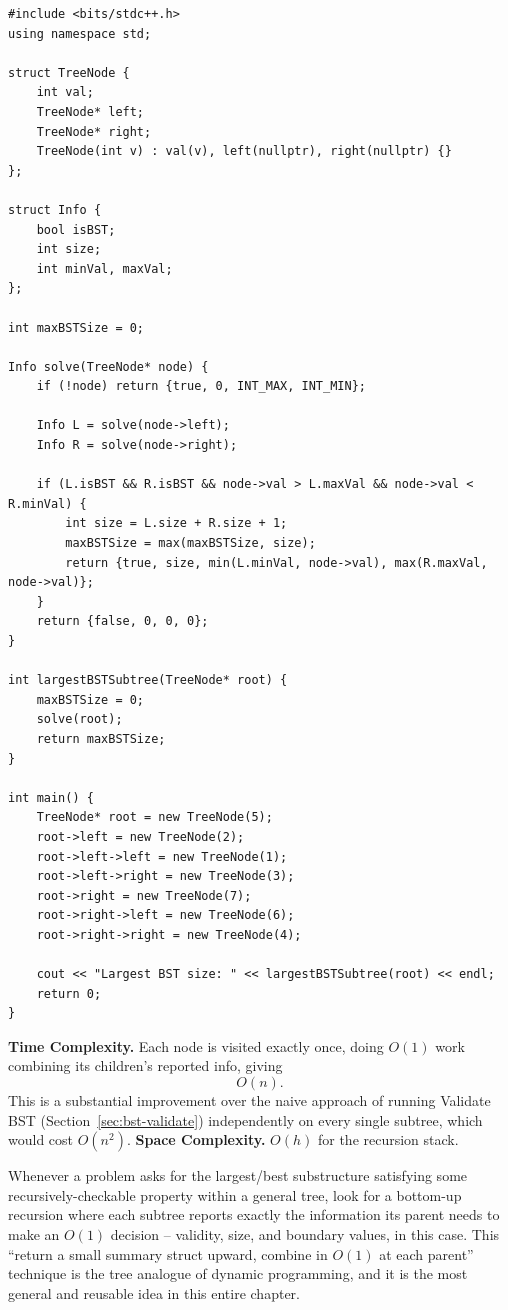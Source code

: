 \begin{lstlisting}
#include <bits/stdc++.h>
using namespace std;

struct TreeNode {
    int val;
    TreeNode* left;
    TreeNode* right;
    TreeNode(int v) : val(v), left(nullptr), right(nullptr) {}
};

struct Info {
    bool isBST;
    int size;
    int minVal, maxVal;
};

int maxBSTSize = 0;

Info solve(TreeNode* node) {
    if (!node) return {true, 0, INT_MAX, INT_MIN};

    Info L = solve(node->left);
    Info R = solve(node->right);

    if (L.isBST && R.isBST && node->val > L.maxVal && node->val < R.minVal) {
        int size = L.size + R.size + 1;
        maxBSTSize = max(maxBSTSize, size);
        return {true, size, min(L.minVal, node->val), max(R.maxVal, node->val)};
    }
    return {false, 0, 0, 0};
}

int largestBSTSubtree(TreeNode* root) {
    maxBSTSize = 0;
    solve(root);
    return maxBSTSize;
}

int main() {
    TreeNode* root = new TreeNode(5);
    root->left = new TreeNode(2);
    root->left->left = new TreeNode(1);
    root->left->right = new TreeNode(3);
    root->right = new TreeNode(7);
    root->right->left = new TreeNode(6);
    root->right->right = new TreeNode(4);

    cout << "Largest BST size: " << largestBSTSubtree(root) << endl;
    return 0;
}
\end{lstlisting}

\begin{complexitybox}
\textbf{Time Complexity.} Each node is visited exactly once, doing
$O(1)$ work combining its children's reported info, giving
\[
  O(n).
\]
This is a substantial improvement over the naive approach of running
Validate BST (Section~\ref{sec:bst-validate}) independently on every
single subtree, which would cost $O(n^2)$.
\textbf{Space Complexity.} $O(h)$ for the recursion stack.
\end{complexitybox}

\begin{takeawaybox}
Whenever a problem asks for the largest/best substructure satisfying some
recursively-checkable property within a general tree, look for a
bottom-up recursion where each subtree reports exactly the information
its parent needs to make an $O(1)$ decision -- validity, size, and
boundary values, in this case. This ``return a small summary struct
upward, combine in $O(1)$ at each parent'' technique is the tree
analogue of dynamic programming, and it is the most general and reusable
idea in this entire chapter.
\end{takeawaybox}
